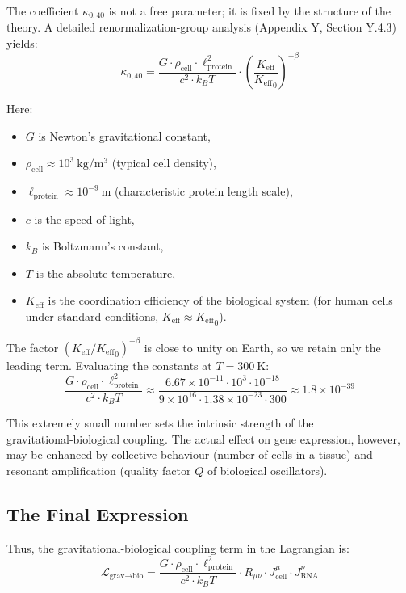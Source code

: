 \documentclass[12pt,a4paper]{article}
\theoremstyle{remark}
\newcommand{\Keff}{K_{\mathrm{eff}}}
\begin{document}
	The coefficient \(\kappa_{0,40}\) is not a free parameter; it is fixed by the structure of the theory. A detailed renormalization‑group analysis (Appendix Y, Section Y.4.3) yields:
	\begin{equation}
		\kappa_{0,40} = \frac{G \cdot \rho_{\text{cell}} \cdot \ell_{\text{protein}}^2}{c^2 \cdot k_B T} \cdot \left( \frac{\Keff}{{\Keff}_0} \right)^{-\beta}
		\label{eq:kappa-exact}
	\end{equation}
	
	Here:
	\begin{itemize}
		\item \(G\) is Newton’s gravitational constant,
		\item \(\rho_{\text{cell}} \approx 10^3\ \mathrm{kg/m^3}\) (typical cell density),
		\item \(\ell_{\text{protein}} \approx 10^{-9}\ \mathrm{m}\) (characteristic protein length scale),
		\item \(c\) is the speed of light,
		\item \(k_B\) is Boltzmann’s constant,
		\item \(T\) is the absolute temperature,
		\item \(\Keff\) is the coordination efficiency of the biological system (for human cells under standard conditions, \(\Keff \approx {\Keff}_0\)).
	\end{itemize}
	
	The factor \((\Keff/{\Keff}_0)^{-\beta}\) is close to unity on Earth, so we retain only the leading term. Evaluating the constants at \(T = 300\ \mathrm{K}\):
	\[
	\frac{G \cdot \rho_{\text{cell}} \cdot \ell_{\text{protein}}^2}{c^2 \cdot k_B T} \approx \frac{6.67\times 10^{-11} \cdot 10^3 \cdot 10^{-18}}{9\times 10^{16} \cdot 1.38\times 10^{-23} \cdot 300} \approx 1.8 \times 10^{-39}
	\]
	
	This extremely small number sets the intrinsic strength of the gravitational‑biological coupling. The actual effect on gene expression, however, may be enhanced by collective behaviour (number of cells in a tissue) and resonant amplification (quality factor \(Q\) of biological oscillators).
	
	\subsection{The Final Expression}
	
	Thus, the gravitational‑biological coupling term in the Lagrangian is:
	\begin{equation}
		\boxed{ \mathcal{L}_{\text{grav}\to\text{bio}} = \frac{G \cdot \rho_{\text{cell}} \cdot \ell_{\text{protein}}^2}{c^2 \cdot k_B T} \cdot R_{\mu\nu} \cdot J_{\text{cell}}^\mu \cdot J_{\text{RNA}}^\nu }
		\label{eq:final}
	\end{equation}
	
\end{document}
